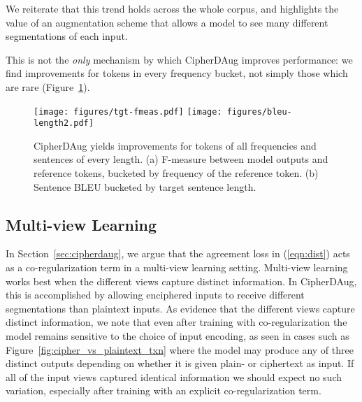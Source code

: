 \documentclass[11pt]{article}
\begin{document}
We reiterate that this trend holds across the whole corpus, and highlights the value of an augmentation scheme that allows a model to see many different segmentations of each input.

This is not the \textit{only} mechanism by which CipherDAug improves performance: we find improvements for tokens in every frequency bucket, not simply those which are rare (Figure~\ref{fig:freq_and_len_buckets}).

\begin{figure}[!ht]
    \texttt{[image: figures/tgt-fmeas.pdf]}
\texttt{[image: figures/bleu-length2.pdf]}
    \caption{CipherDAug yields improvements for tokens of all frequencies and sentences of every length. (a) F-measure between model outputs and reference tokens, bucketed by frequency of the reference token. 
(b) Sentence BLEU bucketed by target sentence length.}
    \label{fig:freq_and_len_buckets}
\end{figure}


\subsection{Multi-view Learning}\label{sec:multiview-analysis}

In Section~\ref{sec:cipherdaug}, we argue that the agreement loss in (\ref{eqn:dist}) acts as a co-regularization term in a multi-view learning setting.
Multi-view learning works best when the different views capture distinct information. In CipherDAug, this is accomplished by allowing enciphered inputs to receive different segmentations than plaintext inputs. As evidence that the different views capture distinct information, we note that even after training with co-regularization the model remains sensitive to the choice of input encoding, as seen in cases such as Figure~\ref{fig:cipher_vs_plaintext_txn} where the model may produce any of three distinct outputs depending on whether it is given plain- or ciphertext as input. If all of the input views captured identical information we should expect no such variation, especially after training with an explicit co-regularization term.
\end{document}
